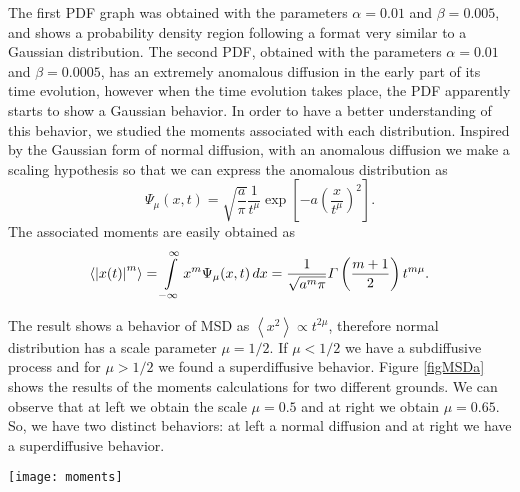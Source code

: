 \documentclass[reprint, aps, pre,nofootinbib]{revtex4-1}
\begin{document}
The first PDF graph was obtained with the parameters $\alpha=0.01$
and $\beta=0.005$, and shows a probability density region following
a format very similar to a Gaussian distribution. The second PDF,
obtained with the parameters $\alpha=0.01$ and $\beta=0.0005$, has
an extremely anomalous diffusion in the early part of its time evolution,
however when the time evolution takes place, the PDF apparently starts
to show a Gaussian behavior. In order to have a better understanding
of this behavior, we studied the moments associated with each distribution.
Inspired by the Gaussian form of normal diffusion, with an anomalous
diffusion we make a scaling hypothesis \citep{Cecconi2022} so that
we can express the anomalous distribution as
\begin{equation}
\Psi_{\mu}(x,t)=\sqrt{\frac{a}{\pi}}\frac{1}{t^{\mu}}\exp\left[-a\left(\frac{x}{t^{\mu}}\right)^{2}\right].\label{GaussForm}
\end{equation}
The associated moments are easily obtained as 
\begin{equation}
\left\langle \left|x(t)\right|^{m}\right\rangle =\intop_{-\infty}^{\infty}x^{m}\Psi_{\mu}(x,t)\,dx=\frac{1}{\sqrt{a^{m}\pi}}\varGamma\left(\frac{m+1}{2}\right)t^{m\mu}.\label{moments}
\end{equation}

The result shows a behavior of MSD as $\left\langle x^{2}\right\rangle \propto t^{2\mu}$,
therefore normal distribution has a scale parameter $\mu=1/2$. If
$\mu<1/2$ we have a subdiffusive process and for $\mu>1/2$ we found
a superdiffusive behavior. Figure \ref{figMSDa} shows the results
of the moments calculations for two different grounds. We can observe
that at left we obtain the scale $\mu=0.5$ and at right we obtain
$\mu=0.65$. So, we have two distinct behaviors: at left a normal
diffusion and at right we have a superdiffusive behavior.
\begin{figure*}
\centering{}\texttt{[image: moments]}\caption{The black lines represent equations of powers $t^{m\mu}$. At left
we have a normal diffusion and at right we have a superdiffusive process.
We can see that more than half of the time evolution has passed before
the superdiffusive behavior with scale $\mu=0.65$ manifests.}
\label{figMSDa}
\end{figure*}
\end{document}
